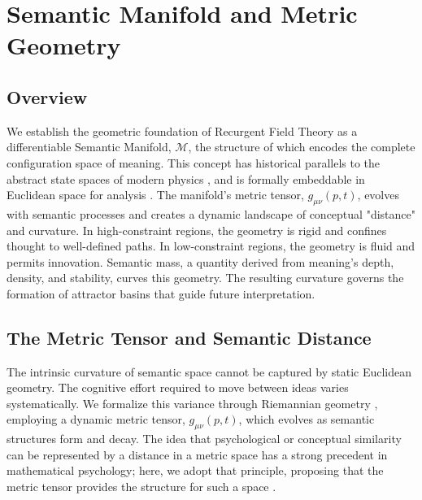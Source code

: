 \chapter{Semantic Manifold and Metric Geometry}
\label{3:semantic_manifold_and_metric_geometry}


\section{Overview}
\label{3.1:overview}

We establish the geometric foundation of Recurgent Field Theory as a differentiable Semantic Manifold, \(\mathcal{M}\), the structure of which encodes the complete configuration space of meaning. This concept has historical parallels to the abstract state spaces of modern physics \autocite{vonNeumann1932}, and is formally embeddable in Euclidean space for analysis \autocite{Whitney1936}. The manifold's metric tensor, \(g_{\mu\nu}(p, t)\), evolves with semantic processes and creates a dynamic landscape of conceptual "distance" and curvature. In high-constraint regions, the geometry is rigid and confines thought to well-defined paths. In low-constraint regions, the geometry is fluid and permits innovation. Semantic mass, a quantity derived from meaning's depth, density, and stability, curves this geometry. The resulting curvature governs the formation of attractor basins that guide future interpretation.


\section{The Metric Tensor and Semantic Distance}
\label{3.2:the_metric_tensor_and_semantic_distance}

The intrinsic curvature of semantic space cannot be captured by static Euclidean geometry. The cognitive effort required to move between ideas varies systematically. We formalize this variance through Riemannian geometry \autocite{Riemann1868, doCarmo1992}, employing a dynamic metric tensor, \(g_{\mu\nu}(p,t)\), which evolves as semantic structures form and decay. The idea that psychological or conceptual similarity can be represented by a distance in a metric space has a strong precedent in mathematical psychology; here, we adopt that principle, proposing that the metric tensor provides the structure for such a space \autocite{Shepard1987}.

